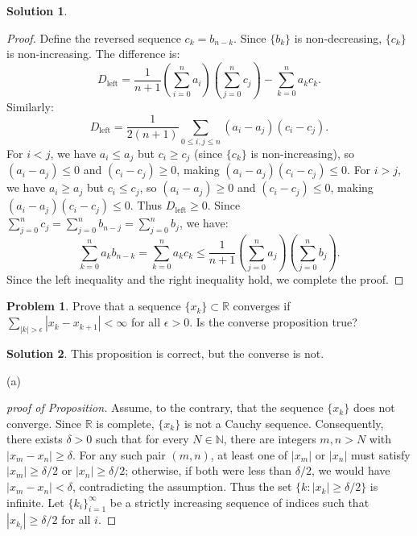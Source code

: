 \documentclass[12pt]{article}
\theoremstyle{definition}
\newtheorem*{solution}{\normalfont\textbf{Solution}}
\newtheorem*{Problem}{\noindent\textbf{Problem}}
\begin{document}
\begin{enumerate}[leftmargin=*]
\begin{solution}
\begin{proof}
                Define the reversed sequence $c_k = b_{n-k}$. Since $\{b_k\}$ is non-decreasing, $\{c_k\}$ is non-increasing. The difference is:
                \[
                D_{\text{left}} = \frac{1}{n+1} \left( \sum_{i=0}^n a_i \right) \left( \sum_{j=0}^n c_j \right) - \sum_{k=0}^n a_k c_k.
                \]
                Similarly:
                \[
                D_{\text{left}} = \frac{1}{2(n+1)} \sum_{0 \leq i,j \leq n} (a_i - a_j)(c_i - c_j).
                \]
                For $i < j$, we have $a_i \leq a_j$ but $c_i \geq c_j$ (since $\{c_k\}$ is non-increasing), so $(a_i - a_j) \leq 0$ and $(c_i - c_j) \geq 0$, making $(a_i - a_j)(c_i - c_j) \leq 0$.  
                For $i > j$, we have $a_i \geq a_j$ but $c_i \leq c_j$, so $(a_i - a_j) \geq 0$ and $(c_i - c_j) \leq 0$, making $(a_i - a_j)(c_i - c_j) \leq 0$. 
                Thus $D_{\text{left}} \geq 0$.
                Since $\sum_{j=0}^n c_j = \sum_{j=0}^n b_{n-j} = \sum_{j=0}^n b_{j}$, we have:
                \[
                \sum_{k=0}^n a_k b_{n-k} = \sum_{k=0}^n a_k c_k \leq \frac{1}{n+1} \left(\sum_{j=0}^n a_{j}\right) \left(\sum_{j=0}^n b_{j}\right).
                \]
                Since the left inequality and the right inequality hold, we complete the proof.
                \end{proof}
    \end{solution}
    \item \begin{Problem}
            Prove that a sequence \( \{ x_k \} \subset \mathbb{R} \) converges if \( \sum_{|k| > \epsilon} |x_k - x_{k + 1}| < \infty \) for all \( \epsilon > 0 \). Is the converse proposition true?
        \end{Problem}      
        \begin{solution}
            This proposition is correct, but the converse is not.
            \item[(a)]
            \begin{proof}[proof of Proposition]
                    Assume, to the contrary, that the sequence \(\{x_k\}\) does not converge. Since \(\mathbb{R}\) is complete, \(\{x_k\}\) is not a Cauchy sequence. Consequently, there exists \(\delta > 0\) such that for every \(N \in \mathbb{N}\), there are integers \(m, n > N\) with \(|x_m - x_n| \geq \delta\). For any such pair \((m,n)\), at least one of \(|x_m|\) or \(|x_n|\) must satisfy \(|x_m| \geq \delta/2\) or \(|x_n| \geq \delta/2\); otherwise, if both were less than \(\delta/2\), we would have \(|x_m - x_n| < \delta\), contradicting the assumption. Thus the set \(\{k : |x_k| \geq \delta/2\}\) is infinite. Let \(\{k_i\}_{i=1}^{\infty}\) be a strictly increasing sequence of indices such that \(|x_{k_i}| \geq \delta/2\) for all \(i\).


\end{proof}
\end{solution}
\end{enumerate}
\end{document}
